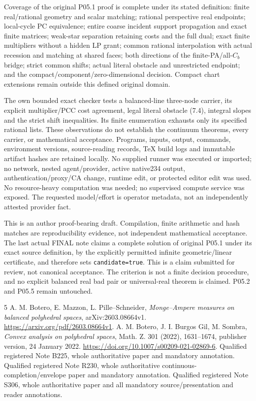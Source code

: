 \documentclass[11pt]{article}
\begin{document}
Coverage of the original P05.1 proof is complete under its stated definition: finite real/rational geometry and scalar matching; rational perspective real endpoints; local-cycle PC equivalence; entire coarse incident support propagation and exact finite matrices; weak-star separation retaining costs and the full dual; exact finite multipliers without a hidden LP grant; common rational interpolation with actual recession and matching at shared faces; both directions of the finite-PA/all-$C_b$ bridge; strict common shifts; actual literal obstacle and unrestricted endpoint; and the compact/component/zero-dimensional decision. Compact chart extensions remain outside this defined original domain.

The own bounded exact checker tests a balanced-line three-node carrier, its explicit multiplier/PCC cost agreement, legal literal obstacle (7.4), integral slopes and the strict shift inequalities. Its finite enumeration exhausts only its specified rational lists. These observations do not establish the continuum theorems, every carrier, or mathematical acceptance. Programs, inputs, output, commands, environment versions, source-reading records, TeX build logs and immutable artifact hashes are retained locally. No supplied runner was executed or imported; no network, nested agent/provider, active native234 output, authentication/proxy/CA change, runtime edit, or protected editor edit was used. No resource-heavy computation was needed; no supervised compute service was exposed. The requested model/effort is operator metadata, not an independently attested provider fact.

This is an author proof-bearing draft. Compilation, finite arithmetic and hash matches are reproducibility evidence, not independent mathematical acceptance. The last actual FINAL note claims a complete solution of original P05.1 under its exact source definition, by the explicitly permitted infinite geometric/linear certificate, and therefore sets \texttt{candidate=true}. This is a claim submitted for review, not canonical acceptance. The criterion is not a finite decision procedure, and no explicit balanced real bad pair or universal-real theorem is claimed. P05.2 and P05.5 remain untouched.

\begin{thebibliography}{5}
 A. M. Botero, E. Mazzon, L. Pille--Schneider, \emph{Monge--Ampere measures on balanced polyhedral spaces}, arXiv:2603.08664v1. \url{https://arxiv.org/pdf/2603.08664v1}.
 A. M. Botero, J. I. Burgos Gil, M. Sombra, \emph{Convex analysis on polyhedral spaces}, Math. Z. 301 (2022), 1631--1674, publisher version, 24 January 2022. \url{https://doi.org/10.1007/s00209-021-02869-6}.
 Qualified registered Note B225, whole authoritative paper and mandatory annotation.
 Qualified registered Note R230, whole authoritative continuous-completion/envelope paper and mandatory annotation.
 Qualified registered Note S306, whole authoritative paper and all mandatory source/presentation and reader annotations.
\end{thebibliography}
\end{document}
